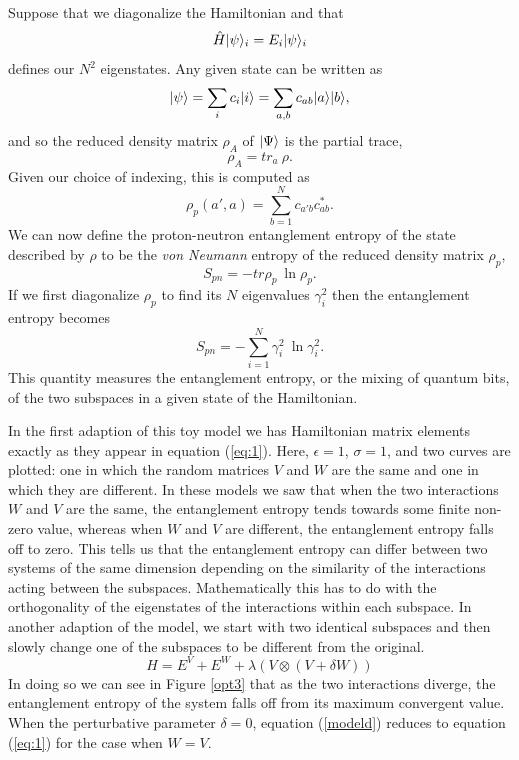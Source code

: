 Suppose that we diagonalize the Hamiltonian and that
\begin{equation}
\hat{H} |\psi\rangle_i = E_i |\psi\rangle_i
\end{equation}
defines our $N^2$ eigenstates. Any given state can be written as 
\begin{equation}
|\psi\rangle = \sum_i c_i |i\rangle = \sum_{a,b} c_{ab} |a\rangle|b\rangle,
\end{equation}
and so the reduced density matrix $\rho_A$  of $|\Psi\rangle$ is the partial trace, 
\begin{equation}
    \rho_A = tr_a\ \rho.
\end{equation}
Given our choice of indexing, this is computed as
\begin{equation}
    \rho_p(a',a) = \sum_{b=1}^N c_{a'b}c_{ab}^*.
\end{equation}
We can now define the proton-neutron entanglement 
entropy of the state described by $\rho$ to be the 
\textit{von Neumann} entropy of the reduced density 
matrix $\rho_p$,
\begin{equation}
    S_{pn} = -tr \rho_p\ \ln \rho_p.
\end{equation}
If we first diagonalize $\rho_p$ to find its $N$ eigenvalues 
$\gamma_i^2$ then the entanglement entropy becomes
\begin{equation}
    S_{pn} = - \sum_{i=1}^N \gamma_i^2\ \ln \gamma_i^2.
\end{equation}
This quantity measures the entanglement entropy, or 
the mixing of quantum bits, of the two subspaces in a 
given state of the Hamiltonian.

In the first adaption of this toy model we has Hamiltonian matrix elements
exactly as they appear in equation (\ref{eq:1}).
Here, $\epsilon=1$, $\sigma=1$, and 
two curves are plotted: one in which the random matrices 
$V$ and $W$ are the same and one in which they are different. 
In these models we saw that when the two interactions $W$ and $V$ are the same, the 
entanglement entropy tends towards some finite non-zero value, 
whereas when $W$ and $V$ are different, the 
entanglement entropy falls off to zero. This tells us that the entanglement 
entropy can differ between two systems of the same dimension depending on 
the similarity of the interactions acting between the subspaces. Mathematically this has to do with the 
orthogonality of the eigenstates of the interactions within each subspace.
In another adaption of the model, we start 
with two identical subspaces and then slowly change 
one of the subspaces to be different from the original. 
\begin{equation}\label{modeld}
	H = E^V + E^W + \lambda(V\otimes(V+\delta W))
\end{equation}
In doing so we can see in Figure \ref{opt3} that as the two interactions diverge, 
the entanglement entropy of the system falls off from its
maximum convergent value. 
When the perturbative parameter $\delta=0$, equation (\ref{modeld})
reduces to equation (\ref{eq:1}) for the case when $W=V$.

